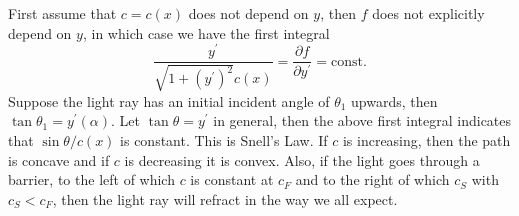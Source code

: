 \documentclass[a4paper]{article}
\begin{document}
First assume that $c=c(x)$ does not depend on $y$, then $f$ does not explicitly depend on $y$, in which case we have the first integral
$$\frac{y^\prime}{\sqrt{1+(y^\prime)^2}c(x)}=\frac{\partial f}{\partial y^\prime}=\text{const.}$$
Suppose the light ray has an initial incident angle of $\theta_1$ upwards, then $\tan\theta_1=y^\prime(\alpha)$.
Let $\tan\theta=y^\prime$ in general, then the above first integral indicates that $\sin\theta/c(x)$ is constant.
This is Snell's Law.
If $c$ is increasing, then the path is concave and if $c$ is decreasing it is convex.
Also, if the light goes through a barrier, to the left of which $c$ is constant at $c_F$ and to the right of which $c_S$ with $c_S<c_F$, then the light ray will refract in the way we all expect.
\end{document}
